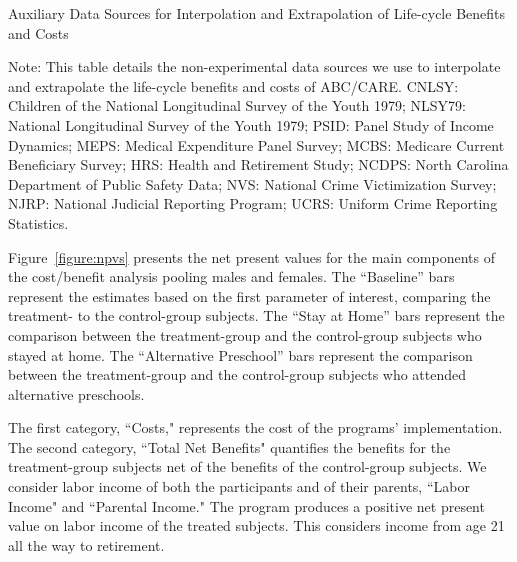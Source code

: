 \begin{table}[!htbp]
\begin{threeparttable}
\caption{Auxiliary Data Sources for Interpolation and Extrapolation of Life-cycle Benefits and Costs} \label{table:sources}
\footnotesize

\begin{tablenotes}
\footnotesize
Note: This table details the non-experimental data sources we use to interpolate and extrapolate the life-cycle benefits and costs of ABC/CARE. CNLSY: Children of the National Longitudinal Survey of the Youth 1979; NLSY79: National Longitudinal Survey of the Youth 1979; PSID: Panel Study of Income Dynamics; MEPS: Medical Expenditure Panel Survey; MCBS: Medicare Current Beneficiary Survey; HRS: Health and Retirement Study; NCDPS: North Carolina Department of Public Safety Data; NVS: National Crime Victimization Survey; NJRP: National Judicial Reporting Program; UCRS: Uniform Crime Reporting Statistics.
\end{tablenotes}
\end{threeparttable}
\end{table}

Figure~\ref{figure:npvs} presents the net present values for the main components of the cost/benefit analysis pooling males and females. The ``Baseline'' bars represent the estimates based on the first parameter of interest, comparing the treatment- to the control-group subjects. The ``Stay at Home'' bars represent the comparison between the treatment-group and the control-group subjects who stayed at home. The ``Alternative Preschool'' bars represent the comparison between the treatment-group and the control-group subjects who attended alternative preschools.

The first category, ``Costs," represents the cost of the programs' implementation. The second category, ``Total Net Benefits" quantifies the benefits for the treatment-group subjects net of the benefits of the control-group subjects. We consider labor income of both the participants and of their parents, ``Labor Income" and ``Parental Income." The program produces a positive net present value on labor income of the treated subjects. This considers income from age 21 all the way to retirement. 

